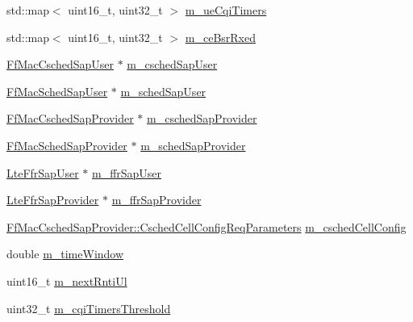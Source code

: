 \begin{DoxyCompactItemize}
\item 
std\+::map$<$ uint16\+\_\+t, uint32\+\_\+t $>$ \hyperlink{classns3_1_1FdBetFfMacScheduler_ae6bef84c07e9ff1f50541f7f286114c6}{m\+\_\+ue\+Cqi\+Timers}
\item 
std\+::map$<$ uint16\+\_\+t, uint32\+\_\+t $>$ \hyperlink{classns3_1_1FdBetFfMacScheduler_a86411f2dd593676d88de396ef4d0b6e5}{m\+\_\+ce\+Bsr\+Rxed}
\item 
\hyperlink{classns3_1_1FfMacCschedSapUser}{Ff\+Mac\+Csched\+Sap\+User} $\ast$ \hyperlink{classns3_1_1FdBetFfMacScheduler_ab080b31d22f662393f898bff73b16a93}{m\+\_\+csched\+Sap\+User}
\item 
\hyperlink{classns3_1_1FfMacSchedSapUser}{Ff\+Mac\+Sched\+Sap\+User} $\ast$ \hyperlink{classns3_1_1FdBetFfMacScheduler_af2eac2234cc5c2b3d9999f9ec66911d3}{m\+\_\+sched\+Sap\+User}
\item 
\hyperlink{classns3_1_1FfMacCschedSapProvider}{Ff\+Mac\+Csched\+Sap\+Provider} $\ast$ \hyperlink{classns3_1_1FdBetFfMacScheduler_ad07e92c82f8fc15b9bcf0130979aaa75}{m\+\_\+csched\+Sap\+Provider}
\item 
\hyperlink{classns3_1_1FfMacSchedSapProvider}{Ff\+Mac\+Sched\+Sap\+Provider} $\ast$ \hyperlink{classns3_1_1FdBetFfMacScheduler_a21bb137452d3069765aa45140a89590c}{m\+\_\+sched\+Sap\+Provider}
\item 
\hyperlink{classns3_1_1LteFfrSapUser}{Lte\+Ffr\+Sap\+User} $\ast$ \hyperlink{classns3_1_1FdBetFfMacScheduler_a28f53a927426fdd8a470ab828a513f35}{m\+\_\+ffr\+Sap\+User}
\item 
\hyperlink{classns3_1_1LteFfrSapProvider}{Lte\+Ffr\+Sap\+Provider} $\ast$ \hyperlink{classns3_1_1FdBetFfMacScheduler_ab4e5d9d4abc7da21a618c5cfed1f9375}{m\+\_\+ffr\+Sap\+Provider}
\item 
\hyperlink{structns3_1_1FfMacCschedSapProvider_1_1CschedCellConfigReqParameters}{Ff\+Mac\+Csched\+Sap\+Provider\+::\+Csched\+Cell\+Config\+Req\+Parameters} \hyperlink{classns3_1_1FdBetFfMacScheduler_a52a10018d36c6a2e69820346a327dfc9}{m\+\_\+csched\+Cell\+Config}
\item 
double \hyperlink{classns3_1_1FdBetFfMacScheduler_acc6dde5313aae9a6a40d72e7c883689c}{m\+\_\+time\+Window}
\item 
uint16\+\_\+t \hyperlink{classns3_1_1FdBetFfMacScheduler_ade4e2b997a835d6205e7275d58884c41}{m\+\_\+next\+Rnti\+Ul}
\item 
uint32\+\_\+t \hyperlink{classns3_1_1FdBetFfMacScheduler_ad25e8d5207cfa78201a9af0d38aab817}{m\+\_\+cqi\+Timers\+Threshold}
\item 

\end{DoxyCompactItemize}
